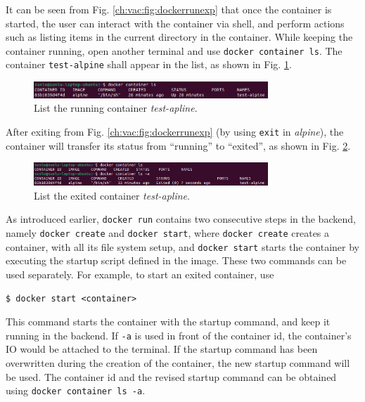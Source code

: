 It can be seen from Fig. \ref{ch:vac:fig:dockerrunexp} that once the container is started, the user can interact with the container via shell, and perform actions such as listing items in the current directory in the container. While keeping the container running, open another terminal and use \verb|docker container ls|. The container \verb|test-alpine| shall appear in the list, as shown in Fig. \ref{ch:vac:fig:dockerrunexppart2}.
\begin{figure}[htbp]
	\centering
	\includegraphics[width=250pt]{chapters/part-3/figures/dockerrunexppart2.png}
	\caption{List the running container \textit{test-apline}.} \label{ch:vac:fig:dockerrunexppart2}
\end{figure}
After exiting from Fig. \ref{ch:vac:fig:dockerrunexp} (by using \verb|exit| in \textit{alpine}), the container will transfer its status from ``running'' to ``exited'', as shown in Fig. \ref{ch:vac:fig:dockerrunexppart3}.
\begin{figure}[htbp]
	\centering
	\includegraphics[width=250pt]{chapters/part-3/figures/dockerrunexppart3.png}
	\caption{List the exited container \textit{test-apline}.} \label{ch:vac:fig:dockerrunexppart3}
\end{figure}

As introduced earlier, \verb|docker run| contains two consecutive steps in the backend, namely \verb|docker create| and \verb|docker start|, where \verb|docker create| creates a container, with all its file system setup, and \verb|docker start| starts the container by executing the startup script defined in the image. These two commands can be used separately. For example, to start an exited container, use
\begin{lstlisting}
$ docker start <container>
\end{lstlisting}
This command starts the container with the startup command, and keep it running in the backend. If \verb|-a| is used in front of the container id, the container's IO would be attached to the terminal. If the startup command has been overwritten during the creation of the container, the new startup command will be used. The container id and the revised startup command can be obtained using \verb|docker container ls -a|.

